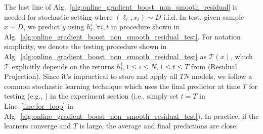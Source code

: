 The last line of Alg.~\ref{alg:online_gradient_boost_non_smooth_residual} is needed for stochastic setting where $(\ell_t, x_t)\sim D$ i.i.d. In test, given sample $x\sim D$, we predict $y$ using $h_t^i, \forall i,t$ in procedure shown in Alg.~\ref{alg:online_gradient_boost_non_smooth_residual_test}. For notation simplicity, we denote the testing procedure shown in Alg.~\ref{alg:online_gradient_boost_non_smooth_residual_test} as $\mathcal{T}(x)$, which $\mathcal{T}$ explicitly depends on the returns $h_t^i, 1\leq i\leq N, 1\leq t\leq T$ from \algshort (Residual Projection). Since it's impractical to store and apply all $TN$ models, we follow a common stochastic learning technique which uses the final predictor at time $T$ for testing (e.g., \cite{SVRG}) in the experiment section (i.e., simply set $t = T$ in Line~\ref{line:for_loop} in Alg.~\ref{alg:online_gradient_boost_non_smooth_residual_test}). 
In practice, if the learners converge and $T$ is large, the average and final predictions are close.

